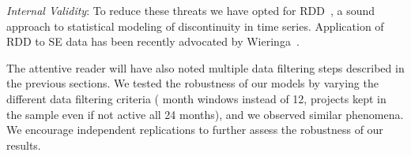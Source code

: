 \smallskip \emph{Internal Validity}: %
To reduce these threats we have opted for RDD~\cite{imbens2008regression}, 
a sound approach to statistical modeling of discontinuity in time series. 
Application of RDD to SE data has been recently advocated 
by Wieringa~\cite{Wieringa}.
 
 
 
The attentive reader will have also noted multiple data filtering 
steps described in the previous sections.
We tested the robustness of our models by varying the different data filtering 
criteria ( month windows instead of 12, projects kept in the sample even 
if not active all 24 months), and we observed similar phenomena.
%
We encourage independent replications to further assess the robustness of our results.
 


